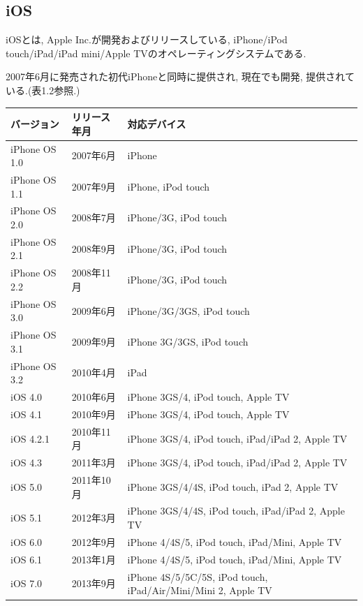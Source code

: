 \subsection{iOS}
iOSとは, Apple Inc.が開発およびリリースしている, iPhone/iPod touch/iPad/iPad mini/Apple TVのオペレーティングシステムである.

2007年6月に発売された初代iPhoneと同時に提供され, 現在でも開発, 提供されている.(表1.2参照.)

\begin{table}[htb]
\begin{center}
\begin{tabular}{|l|l|p{10cm}|} \hline
バージョン & リリース年月 & 対応デバイス \\ \hline \hline
iPhone OS 1.0 & 2007年6月 & iPhone \\ \hline
iPhone OS 1.1 & 2007年9月 & iPhone, iPod touch \\ \hline
iPhone OS 2.0 & 2008年7月 & iPhone/3G, iPod touch \\ \hline
iPhone OS 2.1 & 2008年9月 & iPhone/3G, iPod touch \\ \hline
iPhone OS 2.2 & 2008年11月 & iPhone/3G, iPod touch \\ \hline
iPhone OS 3.0 & 2009年6月 & iPhone/3G/3GS, iPod touch \\ \hline
iPhone OS 3.1 & 2009年9月 & iPhone 3G/3GS, iPod touch \\ \hline
iPhone OS 3.2 & 2010年4月 & iPad \\ \hline
iOS 4.0 & 2010年6月 & iPhone 3GS/4, iPod touch, Apple TV \\ \hline
iOS 4.1 & 2010年9月 & iPhone 3GS/4, iPod touch, Apple TV \\ \hline
iOS 4.2.1 & 2010年11月 & iPhone 3GS/4, iPod touch, iPad/iPad 2, Apple TV \\ \hline
iOS 4.3 & 2011年3月 & iPhone 3GS/4, iPod touch, iPad/iPad 2, Apple TV \\ \hline
iOS 5.0 & 2011年10月 & iPhone 3GS/4/4S, iPod touch, iPad 2, Apple TV \\ \hline
iOS 5.1 & 2012年3月 & iPhone 3GS/4/4S, iPod touch, iPad/iPad 2, Apple TV \\ \hline
iOS 6.0 & 2012年9月 & iPhone 4/4S/5, iPod touch, iPad/Mini, Apple TV \\ \hline
iOS 6.1 & 2013年1月 & iPhone 4/4S/5, iPod touch, iPad/Mini, Apple TV \\ \hline
iOS 7.0 & 2013年9月 & iPhone 4S/5/5C/5S, iPod touch, iPad/Air/Mini/Mini 2, Apple TV \\ \hline

\end{tabular}
\end{center}
\end{table}
